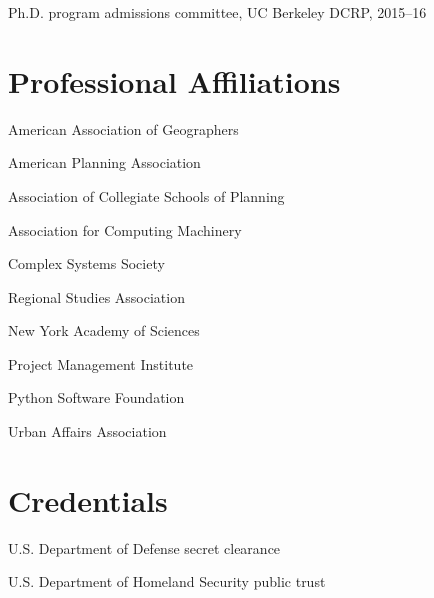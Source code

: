 \documentclass[12pt,letterpaper]{report}
\newcommand{\listitemspace}{0.15em}
\renewenvironment{itemize}
{\begin{list}{}{\setlength{\leftmargin}{0em}
			\setlength{\parskip}{0em}
			\setlength{\itemsep}{\listitemspace}
			\setlength{\parsep}{\listitemspace}}}
	{\end{list}}
\begin{document}
\begin{tablist}
\begin{itemize}
		\item Ph.D. program admissions committee, UC Berkeley DCRP, 2015--16
		
	\end{itemize}
	
	
	
	\section*{Professional Affiliations}
	
	\begin{itemize}
		
		\item American Association of Geographers
		
		\item American Planning Association
		
		\item Association of Collegiate Schools of Planning
		
		\item Association for Computing Machinery
		
		\item Complex Systems Society
		
		\item Regional Studies Association
		
		\item New York Academy of Sciences
		
		\item Project Management Institute
		
		\item Python Software Foundation
		
		\item Urban Affairs Association	
		
	\end{itemize}
	
	
	
	\section*{Credentials}
	
	\begin{itemize}
		
		\item U.S. Department of Defense secret clearance
		
		\item U.S. Department of Homeland Security public trust
		

\end{itemize}
\end{tablist}
\end{document}
